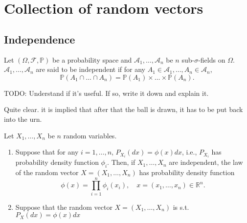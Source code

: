 \chapter{Collection of random vectors}%
\label{cha:Collection of random vectors}

\section{Independence}%
\label{sec:Independence}

\begin{definition}
    \label{def:11.1}
    Let $(\Omega, \mathcal{F}, \mathbb{P})$ be a probability space and $\mathcal{A}_1, \ldots,
    \mathcal{A}_n$ be $n$ sub-$\sigma$-fields on $\Omega$. $\mathcal{A}_1, \ldots, \mathcal{A}_n$
    are said to be independent if for any $A_1 \in \mathcal{A}_1, \ldots, A_n \in \mathcal{A}_n$,
    \[
    \mathbb{P}(A_1 \cap \ldots \cap A_n) = \mathbb{P}(A_1)\times \ldots \times \mathbb{P}(A_n)
    .\] 
\end{definition}

\begin{definition}[]
    \label{def:11.2}
    TODO: Understand if it's useful. If so, write it down and explain it.
\end{definition}

\begin{example}[]
    \label{ex:11.1}
    Quite clear. it is implied that after that the ball is drawn, it has to be put back into
    the urn.
\end{example}

\begin{proposition}[]
    \label{prop:11.4}
    Let $X_1, \ldots, X_n $ be $n $ random variables.
    \begin{enumerate}[label=(\roman*)]
        \item Suppose that for any $i=1, \ldots, n $, $P_{X_i}(dx) = \phi(x)dx$, i.e.,
            $P_{X_i} $ has probability density function $\phi_i $. Then, if $X_1, \ldots, X_n $ 
            are independent, the law of the random vector $X = (X_1, \ldots, X_n) $ has 
            probability density function
            \[
            \phi(x) = \prod_{i=1}^{n} \phi_i(x_{i}), 
            \quad x=(x_1, \ldots, x_{n}) \in \mathbb{R}^{n}
            .\] 
        \item Suppose that the random vector $X=(X_1, \ldots, X_n) $ is s.t.
            $P_X(dx) = \phi(x)dx $
    \end{enumerate}
\end{proposition}

